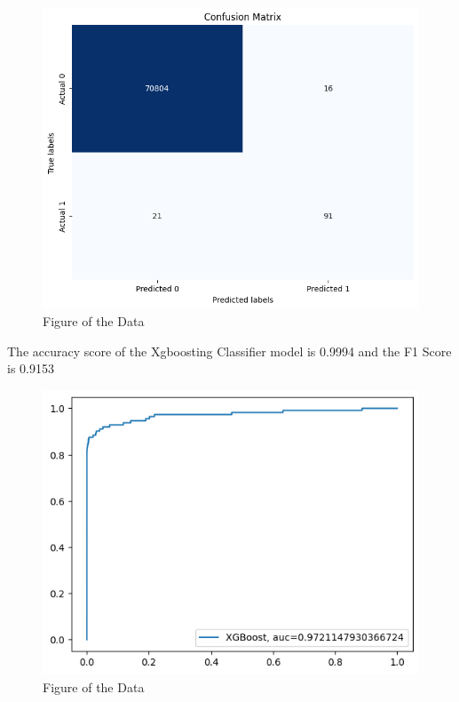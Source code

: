 \begin{figure}[ht]
    \centering
    \includegraphics[scale=0.7]{figures/CM_XGBoost.png}
    \caption{Figure of the Data}
    \label{fig:Plot of the Data}
\end{figure}
 The accuracy score of the Xgboosting Classifier model is 0.9994 and the F1 Score is 0.9153 

 \begin{figure}[ht]
    \centering
    \includegraphics[scale=0.7]{figures/XGBoost.png}
    \caption{Figure of the Data}
    \label{fig:Plot of the Data}
\end{figure}

\clearpage
